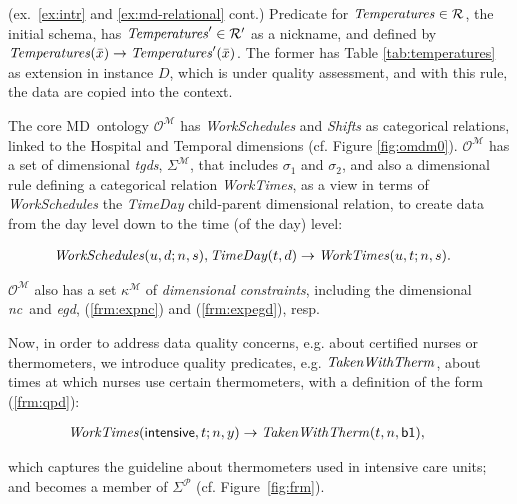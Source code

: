 \documentclass[format=acmsmall, review=false, screen=true]{acmart}
\newcommand{\ignore}[1]{}
\newcommand{\mc}[1]{\mathcal{ #1}}
\newcommand{\nit}[1]{{\it #1}}
\newcommand{\bl}[1]{#1}
\newcommand{\nc}{{\em nc}}
\newcommand{\schema}{\mc{R}}
\newcommand{\md}{MD}
\newcommand{\egd}{{\em egd}}
\newcommand{\tgds}{{\em tgds}}
\begin{document}
\begin{example}\label{ex:frw1} (ex.~\ref{ex:intr} and \ref{ex:md-relational} cont.) Predicate for $\nit{Temperatures} \in \schema$, the initial schema, has $\nit{Temperatures}' \in \schema'$ as a nickname, and defined by
$\nit{Temperatures}(\bar{x}) \rightarrow \nit{Temperatures}'(\bar{x})$. The former has Table \ref{tab:temperatures} as extension in instance $D$, which is under quality assessment, and with this rule, the data are copied into the context.

The core \md \ ontology $\mc{O}^\mc{M}$  has \nit{WorkSchedules} and \nit{Shifts} as categorical relations, linked to the {\sf Hospital} and {\sf Temporal} dimensions (cf. Figure \ref{fig:omdm0}). \ignore{\nit{WardUnit}, \nit{TimeDay} are child-parent relations in the , resp.} $\mc{O}^\mc{M}$ has a set of dimensional \tgds, $\Sigma^\mc{M}$, that includes $\sigma_1$ and $\sigma_2$, and also a
dimensional rule defining a categorical relation \nit{WorkTimes}, as a view in terms of {\it WorkSchedules} the  \nit{TimeDay} child-parent dimensional relation, to create data from the day level down to the time (of the day) level:

\vspace{-4mm}
\begin{align}
{\it WorkSchedules}(u,d;n,s),{\it TimeDay}(t,d) &\rightarrow \nit{WorkTimes}(u,t;n,s).\label{frm:dr1}
\end{align}
\vspace{-3mm}

 $\mc{O}^\mc{M}$ also has a  set $\kappa^\mc{M}$ of {\em dimensional constraints}, including the dimensional \nc \ and \egd, (\ref{frm:expnc}) and (\ref{frm:expegd}), resp.

Now, in order to address data quality concerns, e.g.  about certified nurses or thermometers, we introduce quality predicates, e.g. ${\it TakenWithTherm}$, about times at which nurses use certain thermometers, with a definition of the form (\ref{frm:qpd}):

\vspace{-4mm}
\begin{align}
\hspace{-1cm}\nit{WorkTimes}(\bl{{\sf intensive}},t;n,y) &\rightarrow {\it TakenWithTherm}(t,n,{\sf b1}),\hspace{-7mm}\label{eq:qua1}
\end{align}
\vspace{-5mm}

 \noindent which captures the guideline about thermometers used in \bl{intensive} care units;  and becomes a member of  $\Sigma^\mc{P}$\! (cf. Figure~\ref{fig:frm}).



\end{example}
\end{document}
